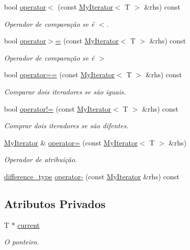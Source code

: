 \begin{DoxyCompactItemize}
bool \hyperlink{classsc_1_1MyIterator_a9ae3587ee793ad0049a1c9b8d0780ba6}{operator$<$} (const \hyperlink{classsc_1_1MyIterator}{My\+Iterator}$<$ T $>$ \&rhs) const
\begin{DoxyCompactList}\small\item\em Operador de comparação se é $<$. \end{DoxyCompactList}\item 
bool \hyperlink{classsc_1_1MyIterator_ae8dbcb46b7277bc105903ae149670600}{operator$>$=} (const \hyperlink{classsc_1_1MyIterator}{My\+Iterator}$<$ T $>$ \&rhs) const
\begin{DoxyCompactList}\small\item\em Operador de comparação se é $>$ \end{DoxyCompactList}\item 
bool \hyperlink{classsc_1_1MyIterator_afde62290f677ab0c46f739008e7ed111}{operator==} (const \hyperlink{classsc_1_1MyIterator}{My\+Iterator}$<$ T $>$ \&rhs) const
\begin{DoxyCompactList}\small\item\em Comparar dois iteradores se são iguais. \end{DoxyCompactList}\item 
bool \hyperlink{classsc_1_1MyIterator_a6a64ad5515a5111089f73871a140e48c}{operator!=} (const \hyperlink{classsc_1_1MyIterator}{My\+Iterator}$<$ T $>$ \&rhs) const
\begin{DoxyCompactList}\small\item\em Comprar dois iteradores se são difentes. \end{DoxyCompactList}\item 
\hyperlink{classsc_1_1MyIterator}{My\+Iterator} \& \hyperlink{classsc_1_1MyIterator_af36f2a583da36cbd26ea491a09810e42}{operator=} (const \hyperlink{classsc_1_1MyIterator}{My\+Iterator}$<$ T $>$ \&rhs)
\begin{DoxyCompactList}\small\item\em Operador de atribuição. \end{DoxyCompactList}\item 
\hyperlink{classsc_1_1MyIterator_ab37e30d9d7abaca8b7ed9c4ba7371798}{difference\+\_\+type} \hyperlink{classsc_1_1MyIterator_a52b15847aa07311fb00a27cff3cbfca2}{operator-\/} (const \hyperlink{classsc_1_1MyIterator}{My\+Iterator} \&rhs) const
\end{DoxyCompactItemize}
\subsection*{Atributos Privados}
\begin{DoxyCompactItemize}
\item 
T $\ast$ \hyperlink{classsc_1_1MyIterator_a33cc25bbe4f629ffff6f8b85b268f1f1}{current}
\begin{DoxyCompactList}\small\item\em O ponteiro. \end{DoxyCompactList}\end{DoxyCompactItemize}


